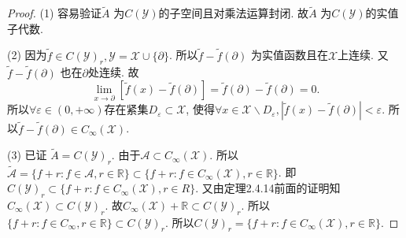 \documentclass[UTF8,twoside]{ctexbook}
\newcommand{\h}{\mathscr}
\newcommand{\kx}{\mathbb}
\numberwithin{equation}{section}
\begin{document}
	\begin{proof}
		(1) 容易验证$\widetilde A$ 为$C(\h Y)$的子空间且对乘法运算封闭. 故$\widetilde A$ 为$C(\h Y)$的实值子代数.

		(2) 因为$\widetilde f\in C(\h Y)_r,\h Y=\h X\cup\{\partial\}$. 所以$\widetilde f-\widetilde f(\partial)$ 为实值函数且在$\h X$上连续. 又$\widetilde f-\widetilde f(\partial)$ 也在$\partial$处连续. 故
		\[
		\lim_{x\rightarrow\partial}[\widetilde f(x)-\widetilde f(\partial)]=\widetilde f(\partial)-\widetilde f(\partial)=0.
		\]
		所以$\forall \varepsilon\in (0,+\infty)$存在紧集$D_\varepsilon\subset \h X$, 使得$\forall x\in \h X\backslash D_\varepsilon, |\widetilde f(x)-\widetilde f(\partial)|<\varepsilon$. 所以$\widetilde f-\widetilde f(\partial)\in C_\infty(\h X)$.

		(3) 已证 $\widetilde A=C(\h Y)_r$. 由于$\h A\subset C_\infty(\h X)$. 所以$\widetilde {\h A} = \{f+r:f\in\h A,r\in \kx R\}\subset\{f+r:f\in C_\infty(\h X),r\in\kx R\}$. 即$C(\h Y)_r\subset\{f+r:f\in C_\infty(\h X),r\in R\}$. 又由定理2.4.14前面的证明知$C_\infty(\h X)\subset C(\h Y)_r$. 故$C_\infty(\h X)+\kx R\subset C(\h Y)_r$. 所以$\{f+r:f\in C_\infty,r\in\kx R\}\subset C(\h Y)_r$. 所以$C(\h Y)_r=\{f+r:f\in C_\infty(\h X),r\in\kx R\}$.
	\end{proof}
\end{document}
